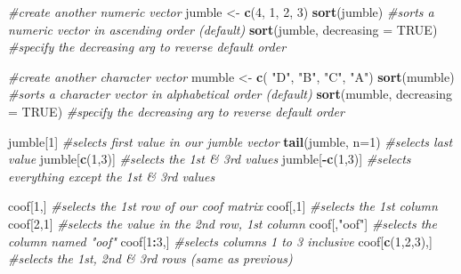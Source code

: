 \documentclass[]{book}
\newenvironment{Shaded}{\begin{snugshade}}{\end{snugshade}}
\newcommand{\CommentTok}[1]{\textcolor[rgb]{0.56,0.35,0.01}{\textit{#1}}}
\newcommand{\DataTypeTok}[1]{\textcolor[rgb]{0.13,0.29,0.53}{#1}}
\newcommand{\DecValTok}[1]{\textcolor[rgb]{0.00,0.00,0.81}{#1}}
\newcommand{\KeywordTok}[1]{\textcolor[rgb]{0.13,0.29,0.53}{\textbf{#1}}}
\newcommand{\NormalTok}[1]{#1}
\newcommand{\OperatorTok}[1]{\textcolor[rgb]{0.81,0.36,0.00}{\textbf{#1}}}
\newcommand{\OtherTok}[1]{\textcolor[rgb]{0.56,0.35,0.01}{#1}}
\newcommand{\StringTok}[1]{\textcolor[rgb]{0.31,0.60,0.02}{#1}}
\begin{document}
\begin{Shaded}
\begin{Highlighting}[]
\CommentTok{#create another numeric vector}
\NormalTok{jumble <-}\StringTok{ }\KeywordTok{c}\NormalTok{(}\DecValTok{4}\NormalTok{, }\DecValTok{1}\NormalTok{, }\DecValTok{2}\NormalTok{, }\DecValTok{3}\NormalTok{)}
\KeywordTok{sort}\NormalTok{(jumble) }\CommentTok{#sorts a numeric vector in ascending order (default)}
\KeywordTok{sort}\NormalTok{(jumble, }\DataTypeTok{decreasing =} \OtherTok{TRUE}\NormalTok{) }\CommentTok{#specify the decreasing arg to reverse default order}

\CommentTok{#create another character vector}
\NormalTok{mumble <-}\StringTok{ }\KeywordTok{c}\NormalTok{( }\StringTok{"D"}\NormalTok{, }\StringTok{"B"}\NormalTok{, }\StringTok{"C"}\NormalTok{, }\StringTok{"A"}\NormalTok{)}
\KeywordTok{sort}\NormalTok{(mumble) }\CommentTok{#sorts a character vector in alphabetical order (default)}
\KeywordTok{sort}\NormalTok{(mumble, }\DataTypeTok{decreasing =} \OtherTok{TRUE}\NormalTok{) }\CommentTok{#specify the decreasing arg to reverse default order}

\NormalTok{jumble[}\DecValTok{1}\NormalTok{] }\CommentTok{#selects first value in our jumble vector}
\KeywordTok{tail}\NormalTok{(jumble, }\DataTypeTok{n=}\DecValTok{1}\NormalTok{) }\CommentTok{#selects last value}
\NormalTok{jumble[}\KeywordTok{c}\NormalTok{(}\DecValTok{1}\NormalTok{,}\DecValTok{3}\NormalTok{)] }\CommentTok{#selects the 1st & 3rd values}
\NormalTok{jumble[}\OperatorTok{-}\KeywordTok{c}\NormalTok{(}\DecValTok{1}\NormalTok{,}\DecValTok{3}\NormalTok{)] }\CommentTok{#selects everything except the 1st & 3rd values}

\NormalTok{coof[}\DecValTok{1}\NormalTok{,] }\CommentTok{#selects the 1st row of our coof matrix}
\NormalTok{coof[,}\DecValTok{1}\NormalTok{] }\CommentTok{#selects the 1st column}
\NormalTok{coof[}\DecValTok{2}\NormalTok{,}\DecValTok{1}\NormalTok{] }\CommentTok{#selects the value in the 2nd row, 1st column}
\NormalTok{coof[,}\StringTok{"oof"}\NormalTok{] }\CommentTok{#selects the column named "oof"}
\NormalTok{coof[}\DecValTok{1}\OperatorTok{:}\DecValTok{3}\NormalTok{,] }\CommentTok{#selects columns 1 to 3 inclusive}
\NormalTok{coof[}\KeywordTok{c}\NormalTok{(}\DecValTok{1}\NormalTok{,}\DecValTok{2}\NormalTok{,}\DecValTok{3}\NormalTok{),] }\CommentTok{#selects the 1st, 2nd & 3rd rows (same as previous)}
\end{Highlighting}
\end{Shaded}
\end{document}
